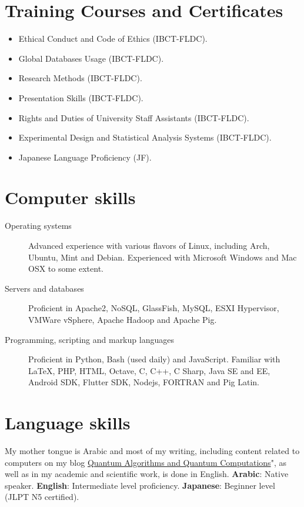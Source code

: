 \documentclass[margin,line]{resume}
\begin{document}
\begin{resume}
\section{\mysidestyle Training Courses and Certificates}
\begin{itemize}

\item Ethical Conduct and Code of Ethics (IBCT-FLDC).
\item Global Databases Usage (IBCT-FLDC).
\item Research Methods (IBCT-FLDC).
\item Presentation Skills (IBCT-FLDC).
\item Rights and Duties of University Staff Assistants (IBCT-FLDC).
\item Experimental Design and Statistical Analysis Systems (IBCT-FLDC).
\item Japanese Language Proficiency (JF).

\end{itemize}

    
    

\section{\mysidestyle Computer skills}\vspace{1mm}
\begin{description}
    \item[Operating systems] Advanced experience with various flavors of Linux, including Arch, Ubuntu, Mint and Debian. Experienced with Microsoft Windows and Mac OSX to some extent.
    \item[Servers and databases] Proficient in Apache2, NoSQL, GlassFish, MySQL, ESXI Hypervisor, VMWare vSphere, Apache Hadoop and Apache Pig.
    \item[Programming, scripting and markup languages] Proficient in Python, Bash (used daily) and JavaScript. Familiar with \LaTeX, PHP, HTML, Octave, C, C++, C Sharp, Java SE and EE, Android SDK, Flutter SDK, Nodejs, FORTRAN and Pig Latin.
\end{description}
    

\section{\mysidestyle Language skills}
My mother tongue is Arabic and most of my writing, including content related to computers on my blog  \href{https://qaqcblog.quora.com/}{Quantum Algorithms and Quantum Computations}", as well as in my academic and scientific work, is done in English.
\textbf{Arabic}: Native speaker.
\textbf{English}: Intermediate level proficiency.
\textbf{Japanese}: Beginner level (JLPT N5 certified).
   
\end{resume}
\end{document}
